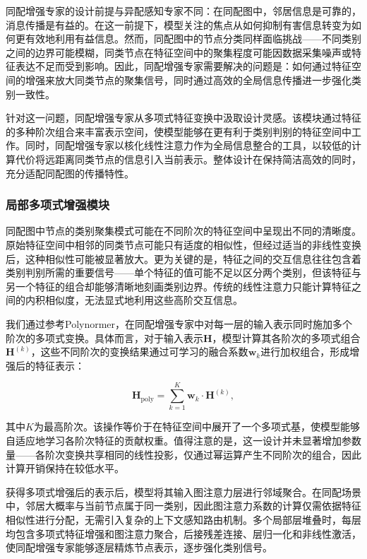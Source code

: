 \documentclass[a4paper,10pt]{article}
\begin{document}
同配增强专家的设计前提与异配感知专家不同：在同配图中，邻居信息是可靠的，消息传播是有益的。在这一前提下，模型关注的焦点从如何抑制有害信息转变为如何更有效地利用有益信息。然而，同配图中的节点分类同样面临挑战——不同类别之间的边界可能模糊，同类节点在特征空间中的聚集程度可能因数据采集噪声或特征表达不足而受到影响。因此，同配增强专家需要解决的问题是：如何通过特征空间的增强来放大同类节点的聚集信号，同时通过高效的全局信息传播进一步强化类别一致性。

针对这一问题，同配增强专家从多项式特征变换中汲取设计灵感。该模块通过特征的多种阶次组合来丰富表示空间，使模型能够在更有利于类别判别的特征空间中工作。同时，同配增强专家以核化线性注意力作为全局信息整合的工具，以较低的计算代价将远距离同类节点的信息引入当前表示。整体设计在保持简洁高效的同时，充分适配同配图的传播特性。

\subsubsection{局部多项式增强模块}

同配图中节点的类别聚集模式可能在不同阶次的特征空间中呈现出不同的清晰度。原始特征空间中相邻的同类节点可能只有适度的相似性，但经过适当的非线性变换后，这种相似性可能被显著放大。更为关键的是，特征之间的交互信息往往包含着类别判别所需的重要信号——单个特征的值可能不足以区分两个类别，但该特征与另一个特征的组合却能够清晰地刻画类别边界。传统的线性注意力只能计算特征之间的内积相似度，无法显式地利用这些高阶交互信息。

我们通过参考Polynormer，在同配增强专家中对每一层的输入表示同时施加多个阶次的多项式变换。具体而言，对于输入表示$\mathbf{H}$，模型计算其各阶次的多项式组合$\mathbf{H}^{(k)}$，这些不同阶次的变换结果通过可学习的融合系数$\mathbf{w}_k$进行加权组合，形成增强后的特征表示：

\begin{equation}
\mathbf{H}_{\text{poly}} = \sum_{k=1}^{K} \mathbf{w}_k \cdot \mathbf{H}^{(k)},
\end{equation}

其中$K$为最高阶次。该操作等价于在特征空间中展开了一个多项式基，使模型能够自适应地学习各阶次特征的贡献权重。值得注意的是，这一设计并未显著增加参数量——各阶次变换共享相同的线性投影，仅通过幂运算产生不同阶次的组合，因此计算开销保持在较低水平。

获得多项式增强后的表示后，模型将其输入图注意力层进行邻域聚合。在同配场景中，邻居大概率与当前节点属于同一类别，因此图注意力系数的计算仅需依据特征相似性进行分配，无需引入复杂的上下文感知路由机制。多个局部层堆叠时，每层均包含多项式特征增强和图注意力聚合，后接残差连接、层归一化和非线性激活，使同配增强专家能够逐层精炼节点表示，逐步强化类别信号。
\end{document}
